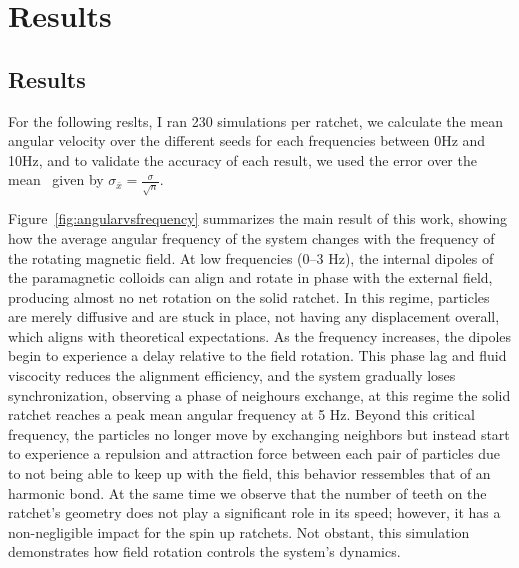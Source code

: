 \part{Results}
\label{part:results}

\chapter{Results}

For the following reslts, I ran 230 simulations per ratchet, we calculate the mean angular velocity over the different seeds for each frequencies between 0Hz and 10Hz, and to validate the accuracy of each result, we used the error over the mean~\cite{altman2005standard} given by $\sigma_{\bar{x}} = \displaystyle\frac{\sigma}{\sqrt{n}}$.

Figure~\ref{fig:angularvsfrequency} summarizes the main result of this work, showing how the average angular frequency of the system changes with the frequency of the rotating magnetic field. At low frequencies (0–3 Hz), the internal dipoles of the paramagnetic colloids can align and rotate in phase with the external field, producing almost no net rotation on the solid ratchet. In this regime, particles are merely diffusive and are stuck in place, not having any displacement overall, which aligns with theoretical expectations.
As the frequency increases, the dipoles begin to experience a delay relative to the field rotation. This phase lag and fluid viscocity reduces the alignment efficiency, and the system gradually loses synchronization, observing a phase of neighours exchange, at this regime the solid ratchet reaches a peak mean angular frequency at 5 Hz. Beyond this critical frequency, the particles no longer move by exchanging neighbors but instead start to experience a repulsion and attraction force between each pair of particles due to not being able to keep up with the field, this behavior ressembles that of an harmonic bond.
At the same time we observe that the number of teeth on the ratchet's geometry does not play a significant role in its speed; however, it has a non-negligible impact for the spin up ratchets.
Not obstant, this simulation demonstrates how field rotation controls the system's dynamics. 

